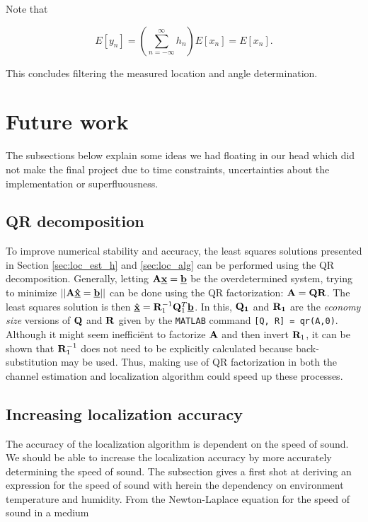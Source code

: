 \documentclass[11pt,titlepage]{report}
\begin{document}
Note that

\begin{equation}
	E[y_n] = \left( \sum_{n=-\infty}^{\infty} h_n \right) E[x_n] = E[x_n].
\end{equation}

This concludes filtering the measured location and angle determination.

\section{Future work}
\label{sec:loc_future}
The subsections below explain some ideas we had floating in our head which did not make the final project due to time constraints, uncertainties about the implementation or superfluousness. 

\subsection{QR decomposition}
To improve numerical stability and accuracy, the least squares solutions presented in Section \ref{sec:loc_est_h} and \ref{sec:loc_alg} can be performed using the QR decomposition. Generally, letting $\mathbf{A}\mathbf{\underline{x}}=\mathbf{\underline{b}}$ be the overdetermined system, trying to minimize $||\mathbf{A}\mathbf{\underline{\hat{x}}}=\mathbf{\underline{b}}||$ can be done using the QR factorization: $\mathbf{A}=\mathbf{Q}\mathbf{R}$. The least squares solution is then $\hat{\mathbf{\underline{x}}}=\mathbf{R}_1^{-1}\mathbf{Q}_1^T\mathbf{\underline{b}}$. In this, $\mathbf{Q_1}$ and $\mathbf{R_1}$ are the \textit{economy size} versions of $\mathbf{Q}$ and $\mathbf{R}$ given by the \texttt{MATLAB} command \texttt{[Q, R] = qr(A,0)}. Although it might seem ineffici\"ent to factorize $\mathbf{A}$ and then invert $\mathbf{R}_1$, it can be shown \cite{num-methods} that $\mathbf{R}_1^{-1}$ does not need to be explicitly calculated because back-substitution may be used. Thus, making use of QR factorization in both the channel estimation and localization algorithm could speed up these processes.

\subsection{Increasing localization accuracy}
The accuracy of the localization algorithm is dependent on the speed of sound. We should be able to increase the localization accuracy by more accurately determining the speed of sound. The subsection gives a first shot at deriving an expression for the speed of sound with herein the dependency on environment temperature and humidity. From the Newton-Laplace equation for the speed of sound in a medium
\end{document}

